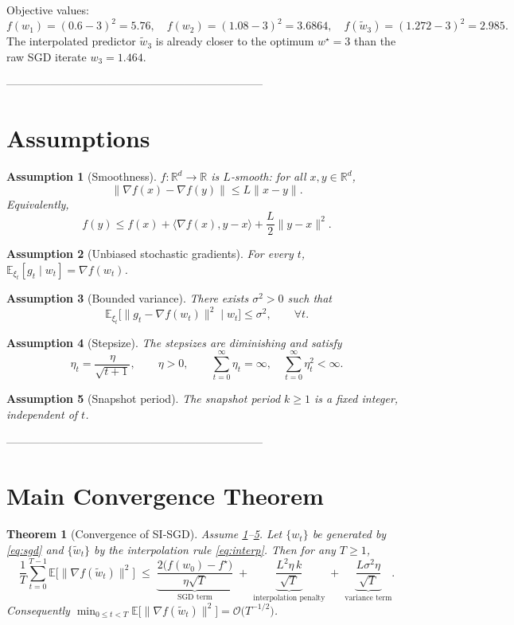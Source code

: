 \documentclass{article}
\newtheorem{theorem}{Theorem}
\newtheorem{assumption}{Assumption}
\newcommand{\E}{\mathbb{E}}
\newcommand{\R}{\mathbb{R}}
\begin{document}
Objective values:
\[
f(w_1)= (0.6-3)^2=5.76,\quad
f(w_2)=(1.08-3)^2=3.6864,\quad
f(\tilde w_3)=(1.272-3)^2=2.985.
\]
The interpolated predictor $\tilde w_3$ is already closer to the optimum $w^\star=3$ than the raw SGD iterate $w_3=1.464$.

---------------------------------------------------------------------

\section*{Assumptions}
\begin{assumption}[Smoothness]\label{as:smooth}
$f:\R^{d}\to\R$ is $L$‑smooth: for all $x,y\in\R^{d}$,
\[
\|\nabla f(x)-\nabla f(y)\|\le L\|x-y\|.
\]
Equivalently,
\[
f(y)\le f(x)+\langle\nabla f(x),y-x\rangle+\frac{L}{2}\|y-x\|^{2}.
\]
\end{assumption}

\begin{assumption}[Unbiased stochastic gradients]\label{as:unbiased}
For every $t$, $\E_{\xi_t}[g_t\mid w_t]=\nabla f(w_t)$.
\end{assumption}

\begin{assumption}[Bounded variance]\label{as:variance}
There exists $\sigma^{2}>0$ such that
\[
\E_{\xi_t}\big[\|g_t-\nabla f(w_t)\|^{2}\mid w_t\big]\le\sigma^{2},\qquad\forall t.
\]
\end{assumption}

\begin{assumption}[Stepsize]\label{as:stepsize}
The stepsizes are diminishing and satisfy
\[
\eta_t=\frac{\eta}{\sqrt{t+1}},\qquad\eta>0,\qquad
\sum_{t=0}^{\infty}\eta_t=\infty,\quad
\sum_{t=0}^{\infty}\eta_t^{2}<\infty .
\]
\end{assumption}

\begin{assumption}[Snapshot period]\label{as:k}
The snapshot period $k\ge1$ is a fixed integer, independent of $t$.
\end{assumption}

---------------------------------------------------------------------

\section*{Main Convergence Theorem}
\begin{theorem}[Convergence of SI‑SGD]\label{thm:main}
Assume \ref{as:smooth}–\ref{as:k}. Let $\{w_t\}$ be generated by \eqref{eq:sgd} and $\{\tilde w_t\}$ by the interpolation rule \eqref{eq:interp}. Then for any $T\ge1$,
\[
\frac{1}{T}\sum_{t=0}^{T-1}\E\big[\|\nabla f(\tilde w_t)\|^{2}\big]
\;\le\;
\underbrace{\frac{2\big(f(w_0)-f^\star\big)}{\eta\sqrt{T}}}_{\text{SGD term}}
\;+\;
\underbrace{\frac{L^{2}\eta\,k}{\sqrt{T}}}_{\text{interpolation penalty}}
\;+\;
\underbrace{\frac{L\sigma^{2}\eta}{\sqrt{T}}}_{\text{variance term}} .
\]
Consequently $\displaystyle\min_{0\le t<T}\E\big[\|\nabla f(\tilde w_t)\|^{2}\big]=\mathcal{O}\!\big(T^{-1/2}\big)$.
\end{theorem}
\end{document}
